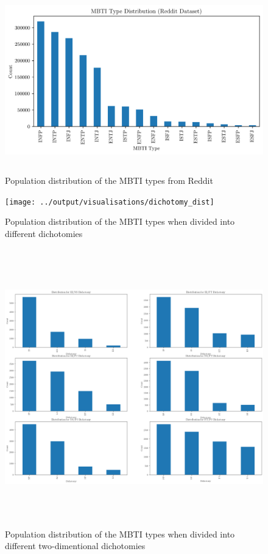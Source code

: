 \documentclass[11pt,a4paper]{article}
\begin{document}
	\begin{figure}[h!]
		\centering
		
		\includegraphics[height=8cm]{../output/visualisations/class_dist_reddit}
		
		\caption{Population distribution of the MBTI types from Reddit}
		
	\end{figure}

		\begin{figure}[h!]
		\centering
		
		\texttt{[image: ../output/visualisations/dichotomy\_dist]}
		
		\caption{Population distribution of the MBTI types when divided into different dichotomies}
		
	\end{figure}

	\begin{figure}[h!]
		\centering
		
		\includegraphics[height=12cm]{../output/visualisations/dichotomy_dist_2}
		
		\caption{Population distribution of the MBTI types when divided into different two-dimentional dichotomies}
		
	\end{figure}
\end{document}
